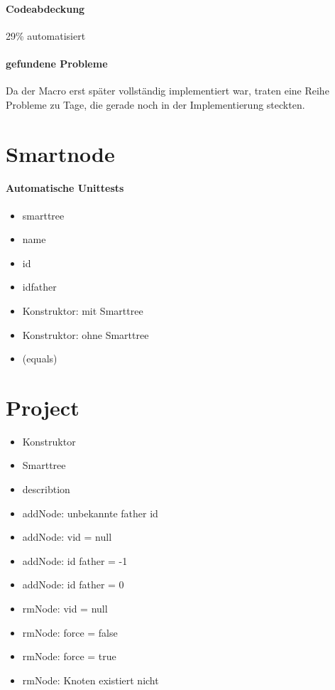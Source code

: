 \paragraph*{Codeabdeckung}
29\% automatisiert
\paragraph*{gefundene Probleme}
\begin{itemize}
Da der Macro erst später vollständig implementiert war, traten eine Reihe Probleme zu Tage, die gerade noch in der Implementierung steckten.
\end{itemize}





\section{Smartnode}
\paragraph{Automatische Unittests}
\begin{itemize}
\item smarttree
\item name
\item id
\item idfather
\item Konstruktor: mit Smarttree
\item Konstruktor: ohne Smarttree
\item (equals)
\end{itemize}
\section{Project}
\begin{itemize}
\paragraph{Automatische Unittests}
\item Konstruktor
\item Smarttree
\item describtion
\item addNode: unbekannte father id
\item addNode: vid = null
\item addNode: id father = -1
\item addNode: id father = 0
\item rmNode: vid = null
\item rmNode: force = false
\item rmNode: force = true
\item rmNode: Knoten existiert nicht
\end{itemize}
